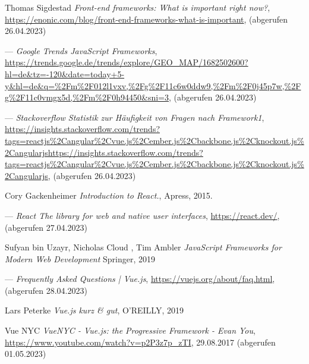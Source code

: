 %

\begin{thebibliography}{99}

    Thomas Sigdestad
	\emph{Front-end frameworks: What is important right now?},
	\url{https://enonic.com/blog/front-end-frameworks-what-is-important},
    (abgerufen 26.04.2023)

	---
	\emph{Google Trends JavaScript Frameworks},
	\url{https://trends.google.de/trends/explore/GEO_MAP/1682502600?hl=de&tz=-120&date=today+5-y&hl=de&q=%2Fm%2F012l1vxv,%2Fg%2F11c6w0ddw9,%2Fm%2F0j45p7w,%2Fg%2F11c0vmgx5d,%2Fm%2F0h94450&sni=3},
	(abgerufen 26.04.2023)

	---
	\emph{Stackoverflow Statistik zur Häufigkeit von Fragen nach Framework1},
	\url{https://insights.stackoverflow.com/trends?tags=reactjs%2Cangular%2Cvue.js%2Cember.js%2Cbackbone.js%2Cknockout.js%2Cangularjshttps://insights.stackoverflow.com/trends?tags=reactjs%2Cangular%2Cvue.js%2Cember.js%2Cbackbone.js%2Cknockout.js%2Cangularjs},
	(abgerufen 26.04.2023)

	Cory Gackenheimer
	\emph{Introduction to React.},
	Apress,
	2015.

	---
	\emph{React
	The library for web and native user interfaces},
	\url{https://react.dev/},
	(abgerufen 27.04.2023)

	Sufyan bin Uzayr, Nicholas Cloud , Tim Ambler
	\emph{JavaScript Frameworks for Modern Web Development}
	Springer,
	2019

	---
	\emph{Frequently Asked Questions | Vue.js},
	\url{https://vuejs.org/about/faq.html},
	(abgerufen 28.04.2023)

	Lars Peterke
	\emph{Vue.js kurz \& gut},
	O’REILLY,
	2019

	Vue NYC
	\emph{VueNYC - Vue.js: the Progressive Framework - Evan You},
	\url{https://www.youtube.com/watch?v=p2P3z7p_zTI},
	29.08.2017
	(abgerufen 01.05.2023)


\end{thebibliography}
